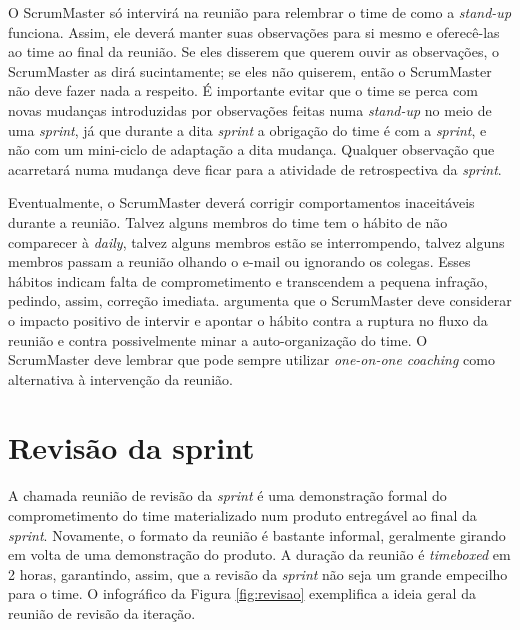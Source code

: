 \documentclass{iiufrgs}
\begin{document}
O ScrumMaster só intervirá na reunião para relembrar o time de como a \textit{stand-up} funciona. Assim, ele deverá manter suas observações para si mesmo e oferecê-las ao time ao final da reunião. Se eles disserem que querem ouvir as observações, o ScrumMaster as dirá sucintamente; se eles não quiserem, então o ScrumMaster não deve fazer nada a respeito. É importante evitar que o time se perca com novas mudanças introduzidas por observações feitas numa \textit{stand-up} no meio de uma \textit{sprint}, já que durante a dita \textit{sprint} a obrigação do time é com a \textit{sprint}, e não com um mini-ciclo de adaptação a dita mudança. Qualquer observação que acarretará numa mudança deve ficar para a atividade de retrospectiva da \textit{sprint}. 

Eventualmente, o ScrumMaster deverá corrigir comportamentos inaceitáveis durante a reunião. Talvez alguns membros do time tem o hábito de não comparecer à \textit{daily}, talvez alguns membros estão se interrompendo, talvez alguns membros passam a reunião olhando o e-mail ou ignorando os colegas. Esses hábitos indicam falta de comprometimento e transcendem a pequena infração, pedindo, assim, correção imediata. \citeauthor{Adkins2010Coaching} argumenta que o ScrumMaster deve considerar o impacto positivo de intervir e apontar o hábito contra a ruptura no fluxo da reunião e contra possivelmente minar a auto-organização do time. O ScrumMaster deve lembrar que pode sempre utilizar \textit{one-on-one coaching} como alternativa à intervenção da reunião.


\section{Revisão da sprint}

A chamada reunião de revisão da \textit{sprint} é uma demonstração formal do comprometimento do time materializado num produto entregável ao final da \textit{sprint}. Novamente, o formato da reunião é bastante informal, geralmente girando em volta de uma demonstração do produto. A duração da reunião é \textit{timeboxed} em 2 horas, garantindo, assim, que a revisão da \textit{sprint} não seja um grande empecilho para o time. O infográfico da Figura \ref{fig:revisao} exemplifica a ideia geral da reunião de revisão da iteração.
\end{document}
